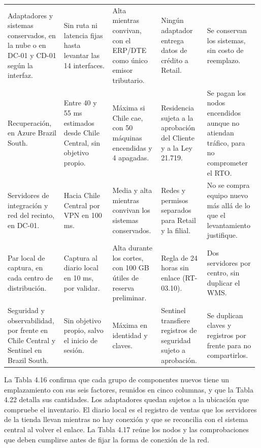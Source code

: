 \documentclass[11pt]{article}
\begin{document}
\begin{longtable}{@{}p{0.22\linewidth}p{0.19\linewidth}p{0.19\linewidth}p{0.18\linewidth}p{0.20\linewidth}@{}}
Adaptadores y sistemas conservados, en la nube o en DC-01 y CD-01 según la interfaz. & Sin ruta ni latencia fijas hasta levantar las 14 interfaces. & Alta mientras convivan, con el ERP/DTE como único emisor tributario. & Ningún adaptador entrega datos de crédito a Retail. & Se conservan los sistemas, sin costo de reemplazo. \\
Recuperación, en Azure Brazil South. & Entre 40 y 55 ms estimados desde Chile Central, sin objetivo propio. & Máxima si Chile cae, con 50 máquinas encendidas y 4 apagadas. & Residencia sujeta a la aprobación del Cliente y a la Ley 21.719. & Se pagan los nodos encendidos aunque no atiendan tráfico, para no comprometer el RTO. \\
Servidores de integración y red del recinto, en DC-01. & Hacia Chile Central por VPN en 100 ms. & Media y alta mientras convivan los sistemas conservados. & Redes y permisos separados para Retail y la filial. & No se compra equipo nuevo más allá de lo que el levantamiento justifique. \\
Par local de captura, en cada centro de distribución. & Captura al diario local en 10 ms, por validar. & Alta durante los cortes, con 100 GB útiles de reserva preliminar. & Regla de 24 horas sin enlace (RT-03.10). & Dos servidores por centro, sin duplicar el WMS. \\
Seguridad y observabilidad, por frente en Chile Central y Sentinel en Brazil South. & Sin objetivo propio, salvo el inicio de sesión. & Máxima en identidad y claves. & Sentinel transfiere registros de seguridad sujeto a aprobación. & Se duplican claves y registros por frente para no compartirlos. \\
\end{longtable}

La Tabla 4.16 confirma que cada grupo de componentes nuevos tiene un emplazamiento con sus seis factores, reunidos en cinco columnas, y que la Tabla 4.22 detalla sus cantidades. Los adaptadores quedan sujetos a la ubicación que compruebe el inventario. El diario local es el registro de ventas que los servidores de la tienda llevan mientras no hay conexión y que se reconcilia con el sistema central al volver el enlace. La Tabla 4.17 reúne los nodos y las comprobaciones que deben cumplirse antes de fijar la forma de conexión de la red.

\par\vspace{0pt plus 10\baselineskip}\vspace{0pt plus -10\baselineskip}
\end{document}
